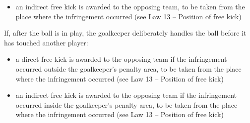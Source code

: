 \begin{itemize}
\item an indirect free kick is awarded to the opposing team, to be taken from the place where the infringement occurred (see Law 13 -- Position of free kick)
\end{itemize}

\bigskip

If, after the ball is in play, the goalkeeper deliberately handles the ball before it has touched another player:

\begin{itemize}
\item a direct free kick is awarded to the opposing team if the infringement occurred outside the goalkeeper's penalty area, to be taken from the place where the infringement occurred (see Law 13 -- Position of free kick)
\item an indirect free kick is awarded to the opposing team if the infringement occurred inside the goalkeeper's penalty area, to be taken from the place where the infringement occurred (see Law 13 -- Position of free kick)
\end{itemize}
